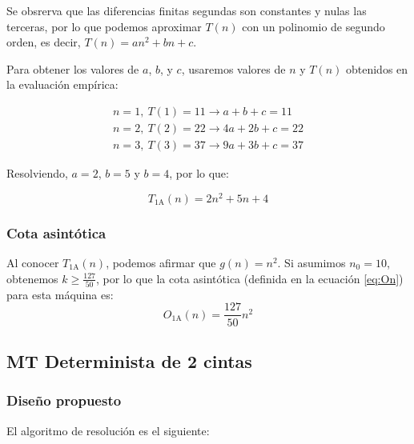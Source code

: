 Se obsrerva que las diferencias finitas segundas son constantes y nulas las terceras, por lo que podemos aproximar $T(n)$ con un polinomio de segundo orden, es decir, $T(n) = an^2 + bn + c$.\medskip

Para obtener los valores de $a$, $b$, y $c$, usaremos valores de $n$ y $T(n)$ obtenidos en la evaluación empírica:

\begin{subequations}
    \begin{gather*}
        n = 1,\ T(1) = 11 \rightarrow a + b + c = 11 \\
        n = 2,\ T(2) = 22 \rightarrow 4a + 2b + c = 22 \\
        n = 3,\ T(3) = 37 \rightarrow 9a + 3b + c = 37
    \end{gather*}
\end{subequations}

Resolviendo, $a=2$, $b=5$ y $b=4$, por lo que:

\begin{equation}
    T_{\mathrm{1A}}(n) = 2n^2 + 5n + 4
\end{equation}

\subsubsection*{Cota asintótica}
Al conocer $T_{\mathrm{1A}}(n)$, podemos afirmar que $g(n) = n^2$. Si asumimos $n_0 = 10$, obtenemos $k \geq \frac{127}{50}$, por lo que la cota asintótica (definida en la ecuación \ref{eq:On}) para esta máquina es:
\begin{equation}
    O_{\mathrm{1A}}(n) = \frac{127}{50} n^2
\end{equation}






\subsection{MT Determinista de 2 cintas}

\subsubsection*{Diseño propuesto}
El algoritmo de resolución es el siguiente:

